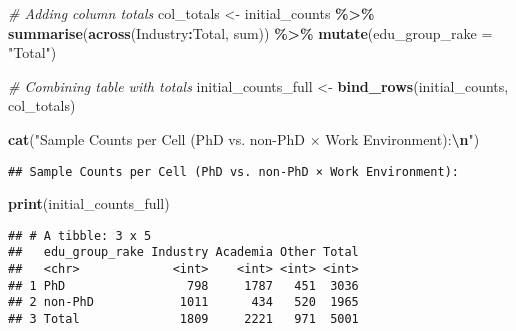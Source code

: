 \documentclass[]{article}
\newenvironment{Shaded}{\begin{snugshade}}{\end{snugshade}}
\newcommand{\AttributeTok}[1]{\textcolor[rgb]{0.13,0.29,0.53}{#1}}
\newcommand{\CommentTok}[1]{\textcolor[rgb]{0.56,0.35,0.01}{\textit{#1}}}
\newcommand{\FunctionTok}[1]{\textcolor[rgb]{0.13,0.29,0.53}{\textbf{#1}}}
\newcommand{\NormalTok}[1]{#1}
\newcommand{\OtherTok}[1]{\textcolor[rgb]{0.56,0.35,0.01}{#1}}
\newcommand{\SpecialCharTok}[1]{\textcolor[rgb]{0.81,0.36,0.00}{\textbf{#1}}}
\newcommand{\StringTok}[1]{\textcolor[rgb]{0.31,0.60,0.02}{#1}}
\begin{document}
\begin{Shaded}
\begin{Highlighting}[]
\CommentTok{\# Adding column totals}
\NormalTok{col\_totals }\OtherTok{\textless{}{-}}\NormalTok{ initial\_counts }\SpecialCharTok{\%\textgreater{}\%}
  \FunctionTok{summarise}\NormalTok{(}\FunctionTok{across}\NormalTok{(Industry}\SpecialCharTok{:}\NormalTok{Total, sum)) }\SpecialCharTok{\%\textgreater{}\%}
  \FunctionTok{mutate}\NormalTok{(}\AttributeTok{edu\_group\_rake =} \StringTok{"Total"}\NormalTok{)}

\CommentTok{\# Combining table with totals }
\NormalTok{initial\_counts\_full }\OtherTok{\textless{}{-}} \FunctionTok{bind\_rows}\NormalTok{(initial\_counts, col\_totals)}

\FunctionTok{cat}\NormalTok{(}\StringTok{"Sample Counts per Cell (PhD vs. non{-}PhD × Work Environment):}\SpecialCharTok{\textbackslash{}n}\StringTok{"}\NormalTok{)}
\end{Highlighting}
\end{Shaded}

\begin{verbatim}
## Sample Counts per Cell (PhD vs. non-PhD × Work Environment):
\end{verbatim}

\begin{Shaded}
\begin{Highlighting}[]
\FunctionTok{print}\NormalTok{(initial\_counts\_full)}
\end{Highlighting}
\end{Shaded}

\begin{verbatim}
## # A tibble: 3 x 5
##   edu_group_rake Industry Academia Other Total
##   <chr>             <int>    <int> <int> <int>
## 1 PhD                 798     1787   451  3036
## 2 non-PhD            1011      434   520  1965
## 3 Total              1809     2221   971  5001
\end{verbatim}
\end{document}
